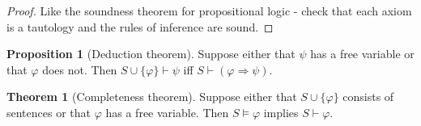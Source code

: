 \documentclass[a4paper]{article}
\theoremstyle{definition}
\newtheorem*{prop}{Proposition}
\newtheorem*{thm}{Theorem}
\begin{document}
\begin{proof}
  Like the soundness theorem for propositional logic - check that each axiom is a tautology and the rules of inference are sound.
\end{proof}

\begin{prop}[Deduction theorem]
  Suppose either that $\psi$ has a free variable or that $\varphi$ does not. Then $S\cup \{\varphi\}\vdash \psi$ iff $S\vdash (\varphi \Rightarrow \psi)$.
\end{prop}

\begin{thm}[Completeness theorem]
  Suppose either that $S\cup \{\varphi\}$ consists of sentences or that $\varphi$ has a free variable. Then $S\models \varphi$ implies $S\vdash \varphi$.
\end{thm}
\end{document}
